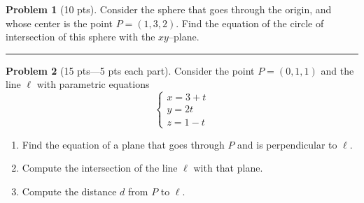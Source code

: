 \documentclass[12pt]{article}
\theoremstyle{definition}
\newtheorem{problem}{Problem}
\begin{document}
\bigskip
\begin{problem}[10 pts]
Consider the sphere that goes through the origin, and whose center is the point $P=(1,3,2)$.  Find the equation of the circle of intersection of this sphere with the $xy$--plane.
\vspace{3cm}
\begin{flushright}
\end{flushright}
\end{problem}
\hrule

\begin{problem}[15 pts---5 pts each part]
Consider the point $P=(0,1,1)$ and the line $\ell$ with parametric equations
\begin{equation*}
\begin{cases}
x = 3+t \\ y = 2t \\ z = 1-t
\end{cases}
\end{equation*}
\begin{enumerate}
\item Find the equation of a plane that goes through $P$ and is perpendicular to $\ell$.
\vspace{2cm}
\begin{flushright}
\end{flushright}
\item  Compute the intersection of the line $\ell$ with that plane.
\vspace{2cm}
\begin{flushright}
\end{flushright}
\item Compute the distance $d$ from $P$ to $\ell$.
\vspace{2cm}
\begin{flushright}
\end{flushright}
\end{enumerate}
\end{problem}
\newpage
\end{document}
